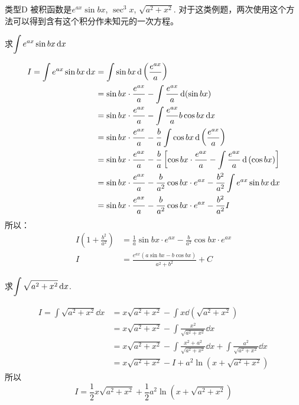 \begin{blk}
    {类型D} 被积函数是$e^{ax}\sin bx$, $\sec^3 x$, $\sqrt{a^2+x^2}$. 对于这类例题，两次使用这个方法可以得到含有这个积分作未知元的一次方程。
\end{blk}

\begin{example}
    求$\displaystyle\int e^{ax}\sin bx\,{\rm d} x$
\end{example}

\begin{solution}
\[\begin{split}
    I=\displaystyle\int e^{ax}\sin bx\,{\rm d} x
    &=\int \sin bx \,{\rm d}\left(\dfrac{e^{ax}}{a}\right)\\
&=\sin bx\cdot \dfrac{e^{ax}}{a}-\int \dfrac{e^{ax}}{a}\,{\rm d}(\sin bx)\\
&=\sin bx\cdot \dfrac{e^{ax}}{a}-\int \dfrac{e^{ax}}{a}b\cos bx\,{\rm d} x\\
&=\sin bx\cdot \dfrac{e^{ax}}{a}-\dfrac{b}{a}\int \cos bx\,{\rm d}\left(\dfrac{e^{ax}}{a}\right)\\
&=\sin bx\cdot \dfrac{e^{ax}}{a}-\dfrac{b}{a}\left[\cos bx\cdot \dfrac{e^{ax}}{a}-\int \dfrac{e^{ax}}{a}\,{\rm d}\left(\cos bx\right)\right]\\
&=\sin bx\cdot \dfrac{e^{ax}}{a}-\dfrac{b}{a^2}\cos bx\cdot e^{ax}-\dfrac{b^2}{a^2}\int e^{ax}\sin bx\,{\rm d} x\\
&=\sin bx\cdot \dfrac{e^{ax}}{a}-\dfrac{b}{a^2}\cos bx\cdot e^{ax}-\dfrac{b^2}{a^2}I
\end{split}\]
所以：
\[\begin{split}
    I\left(1+\frac{b^2}{a^2}\right)&=\frac{1}{a}\sin bx\cdot e^{ax}-\frac{b}{a^2}\cos bx\cdot e^{ax}\\
    I&=\frac{e^{ax}(a\sin bx-b\cos bx)}{a^2+b^2}+C
\end{split}\]    
\end{solution}

\begin{example}
    求$\displaystyle\int \sqrt{a^2+x^2}\,{\rm d} x$.
\end{example}

\begin{solution}
\[    \begin{split}
    I =\int \sqrt{a^{2}+x^{2}} \dd x 
    &=x \sqrt{a^{2}+x^{2}}-\int x \dd\left(\sqrt{a^{2}+x^{2}}\right) \\
    &=x \sqrt{a^{2}+x^{2}}-\int \frac{x^{2}}{\sqrt{a^{2}+x^{2}}} \dd x \\
    &=x \sqrt{a^{2}+x^{2}}-\int \frac{x^{2}+a^{2}}{\sqrt{a^{2}+x^{2}}} \dd x+\int \frac{a^{2}}{\sqrt{a^{2}+x^{2}}} \dd x \\
    &=x \sqrt{a^{2}+x^{2}}-I+a^{2} \ln \left(x+\sqrt{a^{2}+x^{2}}\right)
    \end{split}\]
    所以
\[    I=\frac{1}{2} x \sqrt{a^{2}+x^{2}}+\frac{1}{2} a^{2} \ln \left(x+\sqrt{a^{2}+x^{2}}\right)\]
\end{solution}

